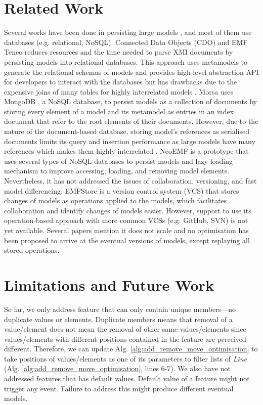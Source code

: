 \documentclass{llncs}
\begin{document}
\section{Related Work}
\label{sec:related_work}
Several works have been done in persisting large models , and most of them use databases (e.g. relational, NoSQL). Connected Data Objects (CDO) \cite{eclipse2017cdo} and EMF Teneo \cite{eclipse2017teneo} reduces resources and the time needed to parse XMI documents by persisting models into relational databases. This approach uses metamodels to generate the relational schemas of models and provides  high-level abstraction API for developers to interact with the databases but has drawbacks due to the expensive joins of many tables for highly interrelated models \cite{barmpis2014evaluation}.    
Morsa \cite{pagan2011morsa} uses MongoDB \cite{mongodb2017what}, a NoSQL database, to persist models as a collection of documents by storing every element of a model and its metamodel as entries in an index document that refer to the root elements of their documents. However, due to the nature of the document-based database, storing model's references as serialised documents limits its query and insertion performance as large models have many references which makes them highly interrelated \cite{barmpis2014evaluation}. NeoEMF \cite{daniel2016neoemf} is a prototype that uses several types of NoSQL databases to persist models and lazy-loading mechanism to improve accessing, loading, and removing model elements. Nevertheless, it has not addressed the issues of collaboration, versioning, and fast model differencing. EMFStore \cite{koegel2010emfstore} is a version control system (VCS) that stores changes of models as operations applied to the models, which facilitates collaboration and identify changes of models easier. However, support to use its operation-based approach with more common VCSs (e.g. GitHub, SVN) is not yet available. Several papers mention it does not scale \cite{pagan2011morsa,kolovos2013research} and no optimisation has been proposed to arrive at the eventual versions of models, except replaying all stored operations. 

\section{Limitations and Future Work}
\label{sec:limitations_and_future_work}
So far, we only address feature that can only contain unique members---no duplicate values or elements. Duplicate members means that removal of a value/element does not mean the removal of other same values/elements since values/elements with different positions contained in the feature are perceived different. Therefore, we can update Alg. \ref{alg:add_remove_move_optimisation} to take positions of values/elements as one of its parameters to filter lists of \emph{Line} (Alg. \ref{alg:add_remove_move_optimisation}, lines 6-7). We also have not addressed features that has default values. Default value of a feature might not trigger any event. Failure to address this might produce different eventual models. 
\end{document}
